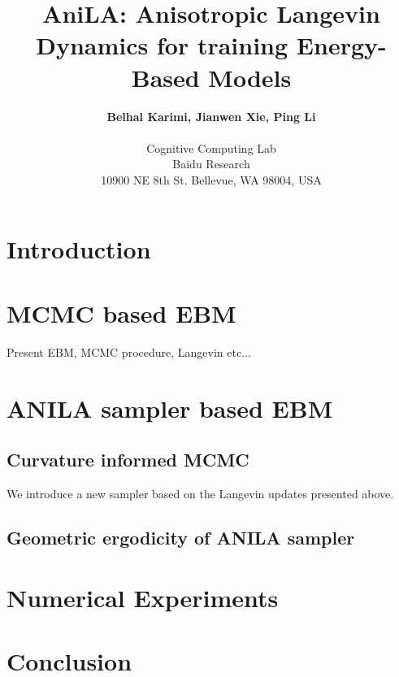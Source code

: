 \documentclass{article}
\begin{document}
\title{AniLA: Anisotropic Langevin Dynamics for training Energy-Based Models}

 \author{\textbf{Belhal Karimi, Jianwen Xie, Ping Li} \\\\
 Cognitive Computing Lab\\
 Baidu Research\\
   10900 NE 8th St. Bellevue, WA 98004, USA
 }

\date{}
\maketitle

\begin{abstract}
\end{abstract}

\section{Introduction}

\section{MCMC based EBM}

Present EBM, MCMC procedure, Langevin etc...

\section{ANILA sampler based EBM}

\subsection{Curvature informed MCMC}

We introduce a new sampler based on the Langevin updates presented above.

\subsection{Geometric ergodicity of ANILA sampler}

\section{Numerical Experiments}


\section{Conclusion}

\newpage






\end{document}
